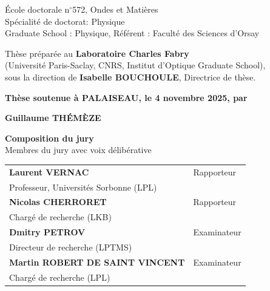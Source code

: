 \documentclass[french,12pt,a4paper]{book}
\begin{document}
\begin{titlepage}
\vspace{1.5cm}

{
\color{black}    
\fontsize{13}{12}\selectfont
École doctorale n$^{\circ}$572, Ondes et Matières\\
Spécialité de doctorat: Physique\\
Graduate School : Physique, Référent : Faculté des Sciences d'Orsay \\
}
\vspace{6mm}

{
\color{black}    
\fontsize{12}{12}\selectfont
Thèse préparée au \textbf{Laboratoire Charles Fabry} \\
(Université Paris-Saclay, CNRS, Institut d’Optique Graduate School),\\
sous la direction de \textbf{Isabelle BOUCHOULE}, Directrice de thèse. \\
}
\vspace{10mm}

{
\color{black}    
\fontsize{12}{12}\selectfont
\textbf{Thèse soutenue à PALAISEAU, le 4 novembre 2025, par}}\\[5mm]
\bigskip

{   
\fontsize{20}{12}\selectfont
    \color{Prune} \textbf{Guillaume THÉMÈZE}
}

\vspace{\fill} %

\bigskip

\flushleft
{\color{Prune} 
\fontsize{12}{12}\selectfont
\textbf{Composition du jury}
}\\
\smallskip
{\color{Prune} %
\fontsize{9}{12}\selectfont 
{Membres du jury avec voix délibérative}} \\
\vspace{2mm}
{\color{black}
\fontsize{10}{12}\selectfont
\begin{tabular}{|p{7cm}l}
\arrayrulecolor{Prune}
\textbf{Laurent VERNAC} &  Rapporteur \\ 
{ Professeur, Universités Sorbonne (LPL)}  &   \\ 
{\textbf{Nicolas CHERRORET}} &  {Rapporteur} \\ 
{Chargé de recherche (LKB)}  &   \\ 
{\textbf{Dmitry PETROV}} &  {Examinateur} \\ 
{Directeur de recherche (LPTMS)}   &   \\ 
{\textbf{Martin ROBERT DE SAINT VINCENT} }&  {Examinateur}\\ 
{ Chargé de recherche (LPL)}  &   \\ 
\end{tabular} \\
}


\end{titlepage}
\end{document}
